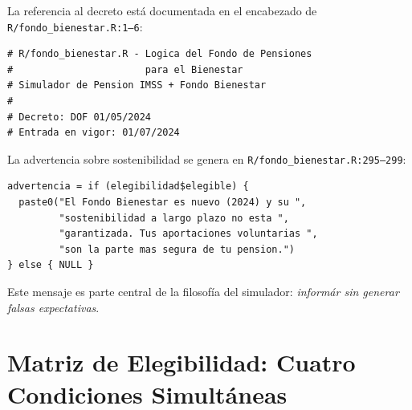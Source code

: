 \documentclass[11pt,a4paper]{report}
\begin{document}
\begin{tcolorbox}[colback=orange!5!white, colframe=orange!75!black, title=\textbf{Aplicaci\'on en C\'odigo}]
La referencia al decreto est\'a documentada en el encabezado de \texttt{R/fondo\_bienestar.R:1--6}:

\begin{lstlisting}
# R/fondo_bienestar.R - Logica del Fondo de Pensiones
#                       para el Bienestar
# Simulador de Pension IMSS + Fondo Bienestar
#
# Decreto: DOF 01/05/2024
# Entrada en vigor: 01/07/2024
\end{lstlisting}

La advertencia sobre sostenibilidad se genera en \texttt{R/fondo\_bienestar.R:295--299}:
\begin{lstlisting}
advertencia = if (elegibilidad$elegible) {
  paste0("El Fondo Bienestar es nuevo (2024) y su ",
         "sostenibilidad a largo plazo no esta ",
         "garantizada. Tus aportaciones voluntarias ",
         "son la parte mas segura de tu pension.")
} else { NULL }
\end{lstlisting}

Este mensaje es parte central de la filosof\'ia del simulador: \emph{inform\'ar sin generar falsas expectativas}.
\end{tcolorbox}

\section{Matriz de Elegibilidad: Cuatro Condiciones Simult\'aneas}
\end{document}
